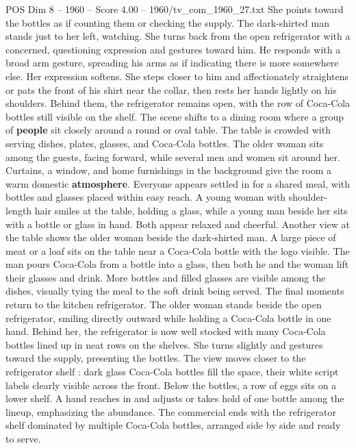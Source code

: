 \begin{textsample}{POS Dim 8 – 1960 – Score 4.00 – 1960/tv\_com\_1960\_27.txt}
She points toward the bottles as if counting them or checking the supply.
The dark-shirted man stands just to her left, watching.
She turns back from the open refrigerator with a concerned, questioning expression and gestures toward him.
He responds with a broad arm gesture, spreading his arms as if indicating there is more somewhere else.
Her expression softens.
She steps closer to him and affectionately straightens or pats the front of his shirt near the collar, then rests her hands lightly on his shoulders.
Behind them, the refrigerator remains open, with the row of Coca-Cola bottles still visible on the shelf.
The scene shifts to a dining room where a group of \textbf{people} sit closely around a round or oval table.
The table is crowded with serving dishes, plates, glasses, and Coca-Cola bottles.
The older woman sits among the guests, facing forward, while several men and women sit around her.
Curtains, a window, and home furnishings in the background give the room a warm domestic \textbf{atmosphere}.
Everyone appears settled in for a shared meal, with bottles and glasses placed within easy reach.
A young woman with shoulder-length hair smiles at the table, holding a glass, while a young man beside her sits with a bottle or glass in hand.
Both appear relaxed and cheerful.
Another view at the table shows the older woman beside the dark-shirted man.
A large piece of meat or a loaf sits on the table near a Coca-Cola bottle with the logo visible.
The man pours Coca-Cola from a bottle into a glass, then both he and the woman lift their glasses and drink.
More bottles and filled glasses are visible among the dishes, visually tying the meal to the soft drink being served.
The final moments return to the kitchen refrigerator.
The older woman stands beside the open refrigerator, smiling directly outward while holding a Coca-Cola bottle in one hand.
Behind her, the refrigerator is now well stocked with many Coca-Cola bottles lined up in neat rows on the shelves.
She turns slightly and gestures toward the supply, presenting the bottles.
The view moves closer to the refrigerator shelf : dark glass Coca-Cola bottles fill the space, their white script labels clearly visible across the front.
Below the bottles, a row of eggs sits on a lower shelf.
A hand reaches in and adjusts or takes hold of one bottle among the lineup, emphasizing the abundance.
The commercial ends with the refrigerator shelf dominated by multiple Coca-Cola bottles, arranged side by side and ready to serve.

\end{textsample}

